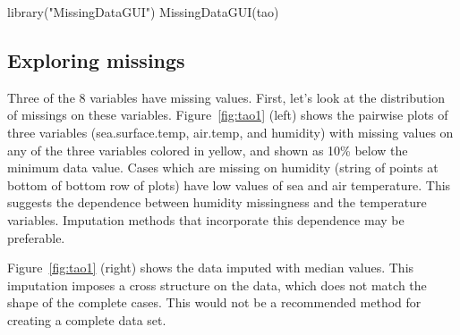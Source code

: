 \documentclass[article]{jss}
\begin{document}
\begin{Code}
library("MissingDataGUI")
MissingDataGUI(tao)
\end{Code}


\subsection{Exploring missings}

Three of the 8 variables have missing values. First, let's look at the distribution of missings on these variables. Figure~\ref{fig:tao1} (left) shows the pairwise plots of three variables (sea.surface.temp, air.temp, and humidity) with missing values on any of the three variables colored in yellow, and shown as 10\% below the minimum data value. Cases which are missing on humidity (string of points at bottom of bottom row of plots) have low values of sea and air temperature. This suggests the dependence between humidity missingness and the temperature variables. Imputation methods that incorporate this dependence may be preferable.

Figure~\ref{fig:tao1} (right) shows the data imputed with median values. This imputation imposes a cross structure on the data, which does not match the shape of the complete cases. This would not be a recommended method for creating a complete data set.
\end{document}
